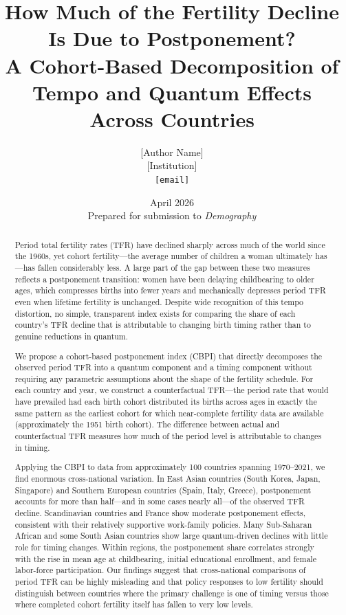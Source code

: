 \documentclass[12pt]{article}
\title{How Much of the Fertility Decline Is Due to Postponement?\\
       A Cohort-Based Decomposition of Tempo and Quantum Effects
       Across Countries}
\author{
  [Author Name]\\
  \small{[Institution]}\\
  \small{\texttt{[email]}}
}
\date{April 2026\\[6pt]
      \small{Prepared for submission to \textit{Demography}}}
\begin{document}
\maketitle

\begin{abstract}
Period total fertility rates (TFR) have declined sharply across much of
the world since the 1960s, yet cohort fertility---the average number of
children a woman ultimately has---has fallen considerably less.  A large
part of the gap between these two measures reflects a postponement
transition: women have been delaying childbearing to older ages, which
compresses births into fewer years and mechanically depresses period TFR
even when lifetime fertility is unchanged.  Despite wide recognition of
this tempo distortion, no simple, transparent index exists for comparing
the share of each country's TFR decline that is attributable to changing
birth timing rather than to genuine reductions in quantum.

We propose a cohort-based postponement index (CBPI) that directly
decomposes the observed period TFR into a quantum component and a
timing component without requiring any parametric assumptions about the
shape of the fertility schedule.  For each country and year, we
construct a counterfactual TFR---the period rate that would have
prevailed had each birth cohort distributed its births across ages in
exactly the same pattern as the earliest cohort for which near-complete
fertility data are available (approximately the 1951 birth cohort).  The
difference between actual and counterfactual TFR measures how much of
the period level is attributable to changes in timing.

Applying the CBPI to data from approximately 100 countries spanning
1970--2021, we find enormous cross-national variation.  In East Asian
countries (South Korea, Japan, Singapore) and Southern European
countries (Spain, Italy, Greece), postponement accounts for more than
half---and in some cases nearly all---of the observed TFR decline.
Scandinavian countries and France show moderate postponement effects,
consistent with their relatively supportive work-family policies.
Many Sub-Saharan African and some South Asian countries show large
quantum-driven declines with little role for timing changes.  Within
regions, the postponement share correlates strongly with the rise in
mean age at childbearing, initial educational enrollment, and female
labor-force participation.  Our findings suggest that cross-national
comparisons of period TFR can be highly misleading and that policy
responses to low fertility should distinguish between countries where
the primary challenge is one of timing versus those where completed
cohort fertility itself has fallen to very low levels.
\end{abstract}
\end{document}
